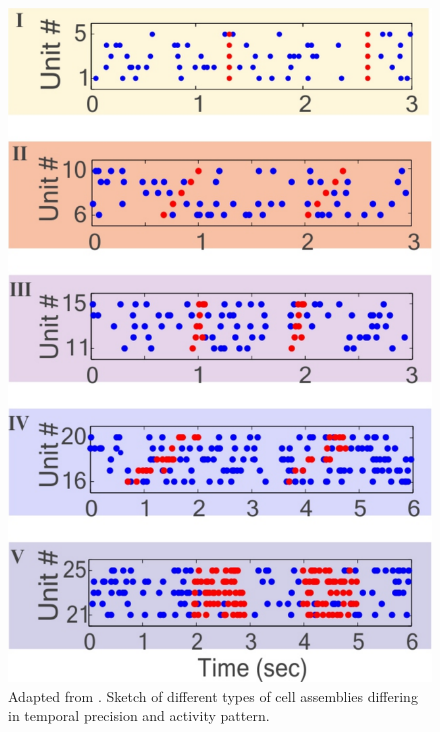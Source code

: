 \begin{framed}
\begin{figure}[H]
    \includegraphics[scale=0.21]{figures/CellAssembliesZoom.pdf}
    \caption{Adapted from \cite{RussoDurstewitz}. Sketch of different types of cell assemblies differing in temporal precision and activity pattern.}
    \label{fig:CellAsseDet}
\end{figure}

\end{framed}
